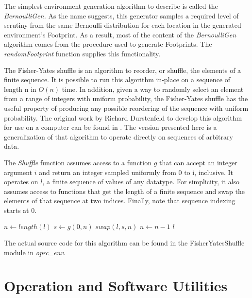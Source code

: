 The simplest environment generation algorithm to describe is called the \textit{BernoulliGen.} As the name suggests, this generator samples a required level of scrutiny from the same Bernoulli distribution for each location in the generated environment's Footprint. As a result, most of the content of the \textit{BernoulliGen} algorithm comes from the procedure used to generate Footprints. The \textit{randomFootprint} function supplies this functionality.  



The Fisher-Yates shuffle is an algorithm to reorder, or shuffle, the elements of a finite sequence. It is possible to run this algorithm in-place on a sequence of length n in $O(n)$ time. In addition, given a way to randomly select an element from a range of integers with uniform probability, the Fisher-Yates shuffle has the useful property of producing any possible reordering of the sequence with uniform probability. The original work by Richard Durstenfeld to develop this algorithm for use on a computer can be found in \cite{FYShuffle}. The version presented here is a generalization of that algorithm to operate directly on sequences of arbitrary data.

The \textit{Shuffle} function assumes access to a function $g$ that can accept an integer argument $i$ and return an integer sampled uniformly from 0 to i, inclusive. It operates on $l$, a finite sequence of values of any datatype. For simplicity, it also assumes access to functions that get the length of a finite sequence and swap the elements of that sequence at two indices. Finally, note that sequence indexing starts at 0.

\begin{algorithmic}

  \State $n\gets length(l)$	
      \State $s\gets g(0, n)$
      \State $swap(l, s, n)$
      \State $n\gets n - 1$
  \EndWhile
  \State \Return $l$
\EndFunction

\end{algorithmic}

The actual source code for this algorithm can be found in the FisherYatesShuffle module in \textit{oprc\_env}.

\section{Operation and Software Utilities}

